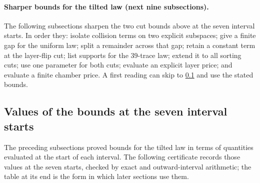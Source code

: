 \paragraph{Sharper bounds for the tilted law (next nine subsections).}
The following subsections sharpen the two cut bounds above at the
seven interval starts. In order they: isolate collision terms on
two explicit subspaces; give a finite gap for the uniform law;
split a remainder across that gap; retain a constant term at the
layer-flip cut; list supports for the $39$-trace law; extend it to
all sorting cuts; use one parameter for both cuts; evaluate an
explicit layer price; and evaluate a finite chamber price. A first reading can skip to
\cref{subsec:positive-root-caps} and use the stated bounds.



\subsection{Values of the bounds at the seven interval starts}\label{subsec:positive-root-caps}

The preceding subsections proved bounds for the tilted law in
terms of quantities evaluated at the start of each interval. The
following certificate records those values at the seven starts,
checked by exact and outward-interval arithmetic; the table at its
end is the form in which later sections use them.

